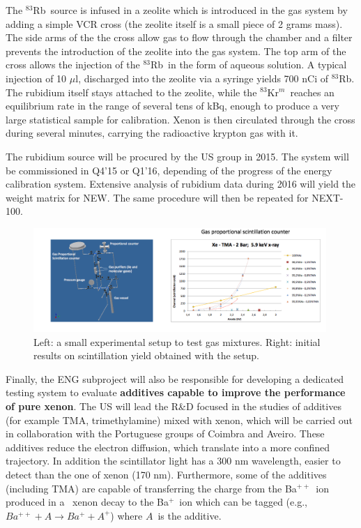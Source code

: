 The $^{83}$Rb~source is infused in a zeolite which is introduced in the gas system by adding a simple VCR cross (the zeolite itself is a small piece of 2 grams mass). The side arms of the the cross allow gas to flow through the chamber and a filter prevents the introduction of the zeolite into the gas system. The top arm of the cross allows the injection of the $^{83}$Rb~in the form of aqueous solution. A typical injection of 10 $\mu$l, discharged into the zeolite via a syringe yields 700 nCi of $^{83}$Rb. The rubidium itself stays attached to the zeolite, while the $^{83}$Kr$^m$~reaches an equilibrium rate in the range of several tens of kBq, enough to produce a very large statistical sample for calibration. Xenon is then circulated through the cross during several minutes, carrying the radioactive krypton gas with it.  

The rubidium source will be procured by the US group in 2015. The system will be commissioned in Q4'15 or Q1'16, depending of the progress of the energy calibration system. Extensive analysis of rubidium data during 2016 will yield the weight matrix for NEW. The same procedure will then be repeated for NEXT-100. 

\begin{figure}
\begin{center}
\includegraphics[width=0.99\textwidth]{img/TMA.png}
\caption{\small Left: a small experimental setup to test gas mixtures. Right: initial results on scintillation yield obtained with the setup.}
\label{fig:additives}
\end{center}
\end{figure}

Finally, the ENG subproject will also be responsible for developing a dedicated testing system to evaluate {\bf additives capable to improve the performance of pure xenon}. The US will lead the R\&D focused in the studies of additives (for example TMA, trimethylamine) mixed with xenon, which will be carried out in collaboration with the Portuguese groups of Coimbra and Aveiro. These additives reduce the electron diffusion, which translate into a more confined trajectory.  In addition the scintillator light has  a 300 nm wavelength, easier to detect than the one of xenon (170 nm). Furthermore, some of the additives (including TMA) are capable of transferring the charge from the Ba$^{++}$~ion produced in a \bb\ xenon decay to
the Ba$^{+}$~ion which can be tagged (e.g., $Ba^{++} + A \rightarrow Ba^{+} + A^{+}$) where $A$~is the additive. 

